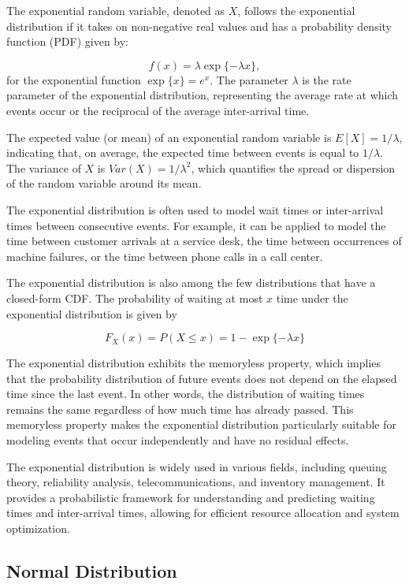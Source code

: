\documentclass{article}
\begin{document}
The exponential random variable, denoted as $X$, follows the exponential distribution if it takes on non-negative real values and has a probability density function (PDF) given by:

$$
f(x) = \lambda \exp{\{- \lambda x\}},
$$
for the exponential function $\exp{\{ x \}} = e^x$. The parameter $\lambda$ is the rate parameter of the exponential distribution, representing the average rate at which events occur or the reciprocal of the average inter-arrival time.

The expected value (or mean) of an exponential random variable is $E[X] = 1/\lambda$, indicating that, on average, the expected time between events is equal to $1/\lambda$. The variance of $X$ is $Var(X) = 1/\lambda^2$, which quantifies the spread or dispersion of the random variable around its mean.

The exponential distribution is often used to model wait times or inter-arrival times between consecutive events. For example, it can be applied to model the time between customer arrivals at a service desk, the time between occurrences of machine failures, or the time between phone calls in a call center.

The exponential distribution is also among the few distributions that have a closed-form CDF. The probability of waiting at most $x$ time under the exponential distribution is given by

$$
F_X(x) = P(X \leq x) = 1 - \exp{\{- \lambda x\}}
$$

The exponential distribution exhibits the memoryless property, which implies that the probability distribution of future events does not depend on the elapsed time since the last event. In other words, the distribution of waiting times remains the same regardless of how much time has already passed. This memoryless property makes the exponential distribution particularly suitable for modeling events that occur independently and have no residual effects.

The exponential distribution is widely used in various fields, including queuing theory, reliability analysis, telecommunications, and inventory management. It provides a probabilistic framework for understanding and predicting waiting times and inter-arrival times, allowing for efficient resource allocation and system optimization.

\subsection{Normal Distribution}
\end{document}
